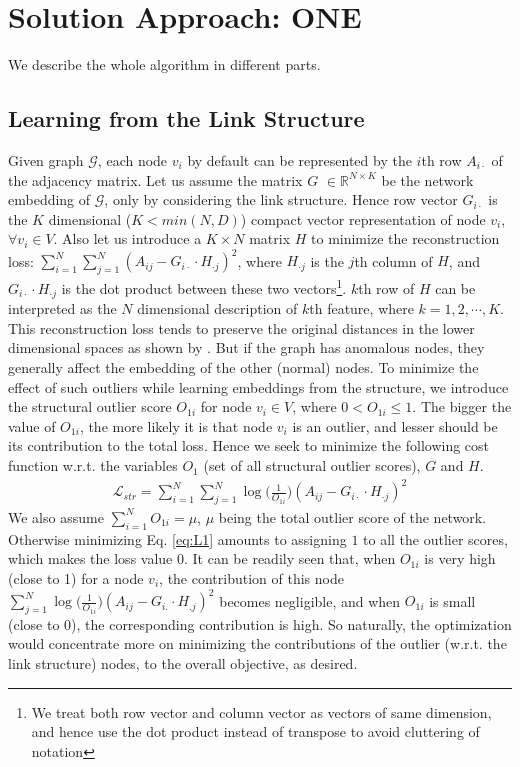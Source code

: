 \documentclass[letterpaper]{article} %
\begin{document}
\section{Solution Approach: ONE}
We describe the whole algorithm in different parts.
\subsection{Learning from the Link Structure}
Given graph $\mathcal{G}$, each node $v_i$ by default can be represented by the $i$th row $A_{i\cdot}$ of the adjacency matrix. Let us assume the matrix $G$ $\in \mathbb{R}^{N \times K}$ be the network embedding of $\mathcal{G}$, only by considering the link structure. Hence row vector $G_{i\cdot}$ is the $K$ dimensional ($K < min(N,D)$) compact vector representation of node $v_i$, $\forall v_i \in V$. Also let us introduce a $K \times N$ matrix $H$ to minimize the reconstruction loss: $\sum\limits_{i=1}^N\sum\limits_{j=1}^N (A_{ij} - G_{i\cdot} \cdot H_{\cdot j})^2$, where $H_{\cdot j}$ is the $j$th column of $H$, and $G_{i\cdot} \cdot H_{\cdot j}$ is the dot product between these two vectors\footnote[1]{We treat both row vector and column vector as vectors of same dimension, and hence use the dot product instead of transpose to avoid  cluttering of notation}. $k$th row of $H$ can be interpreted as the $N$ dimensional description of $k$th feature, where $k = 1,2,\cdots,K$. This reconstruction loss tends to preserve the original distances in the lower dimensional spaces as shown by \cite{cunningham2015}. But if the graph has anomalous nodes, they generally affect the embedding of the other (normal) nodes. To minimize the effect of such outliers while learning embeddings from the structure, we introduce the structural outlier score $O_{1i}$ for node $v_i \in V$, where $0 < O_{1i} \leq 1$. The bigger the value of $O_{1i}$, the more likely it is that node $v_i$ is an outlier, and lesser should be its contribution to the total loss. Hence we seek to minimize the following cost function w.r.t. the variables $O_1$ (set of all structural outlier scores), $G$ and $H$.
\begin{align}\label{eq:L1}
\mathcal{L}_{str} = \sum_{i=1}^N\sum_{j=1}^N\log\Big({\frac{1}{O_{1i}}}\Big) (A_{ij} - G_{i\cdot} \cdot H_{\cdot j})^2
\end{align}
We also assume $\sum\limits_{i=1}^N O_{1i} = \mu$, $\mu$ being the total outlier score of the network. Otherwise minimizing Eq. 
\ref{eq:L1} amounts to assigning $1$ to all the outlier scores, which makes the loss value 0. It can be readily seen that, when $O_{1i}$ is very high (close to 1) for a node $v_i$, the contribution of this node $\sum\limits_{j=1}^N\log\Big({\frac{1}{O_{1i}}}\Big) (A_{ij} - G_{i.} \cdot H_{.j})^2$ becomes negligible, and when $O_{1i}$ is small (close to 0), the corresponding contribution is high. So naturally, the optimization would concentrate more on minimizing the contributions of the outlier (w.r.t. the link structure) nodes, to the overall objective, as desired. 
\end{document}
